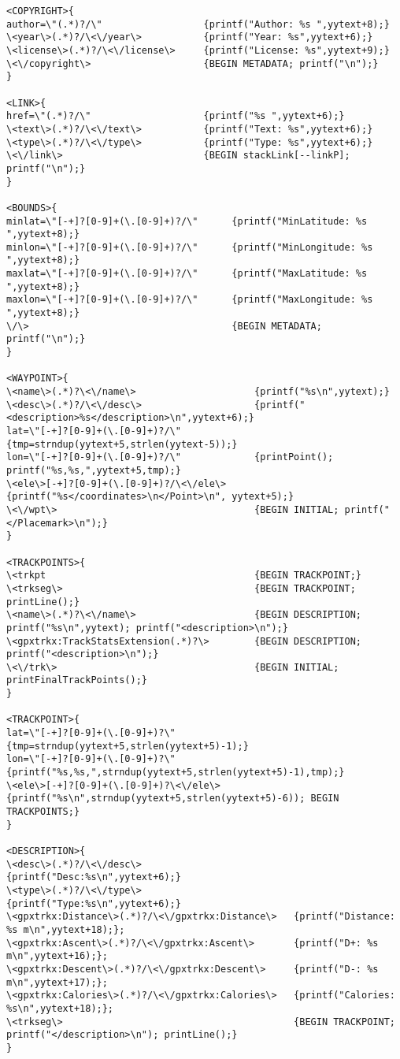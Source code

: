 \documentclass{llncs}
\begin{document}
\begin{changemargin}{-4cm}{0cm}
\begin{verbatim}
<COPYRIGHT>{
author=\"(.*)?/\"                  {printf("Author: %s ",yytext+8);}
\<year\>(.*)?/\<\/year\>           {printf("Year: %s",yytext+6);}
\<license\>(.*)?/\<\/license\>     {printf("License: %s",yytext+9);}
\<\/copyright\>                    {BEGIN METADATA; printf("\n");}
}

<LINK>{
href=\"(.*)?/\"                    {printf("%s ",yytext+6);}
\<text\>(.*)?/\<\/text\>           {printf("Text: %s",yytext+6);}
\<type\>(.*)?/\<\/type\>           {printf("Type: %s",yytext+6);}
\<\/link\>                         {BEGIN stackLink[--linkP]; printf("\n");}
}

<BOUNDS>{
minlat=\"[-+]?[0-9]+(\.[0-9]+)?/\"      {printf("MinLatitude: %s ",yytext+8);}
minlon=\"[-+]?[0-9]+(\.[0-9]+)?/\"      {printf("MinLongitude: %s ",yytext+8);}
maxlat=\"[-+]?[0-9]+(\.[0-9]+)?/\"      {printf("MaxLatitude: %s ",yytext+8);}
maxlon=\"[-+]?[0-9]+(\.[0-9]+)?/\"      {printf("MaxLongitude: %s ",yytext+8);}
\/\>                                    {BEGIN METADATA; printf("\n");}
}

<WAYPOINT>{
\<name\>(.*)?\<\/name\>                     {printf("%s\n",yytext);}
\<desc\>(.*)?/\<\/desc\>                    {printf("<description>%s</description>\n",yytext+6);}
lat=\"[-+]?[0-9]+(\.[0-9]+)?/\"             {tmp=strndup(yytext+5,strlen(yytext-5));}
lon=\"[-+]?[0-9]+(\.[0-9]+)?/\"             {printPoint(); printf("%s,%s,",yytext+5,tmp);}
\<ele\>[-+]?[0-9]+(\.[0-9]+)?/\<\/ele\>     {printf("%s</coordinates>\n</Point>\n", yytext+5);}
\<\/wpt\>                                   {BEGIN INITIAL; printf("</Placemark>\n");}
}

<TRACKPOINTS>{
\<trkpt                                     {BEGIN TRACKPOINT;}
\<trkseg\>                                  {BEGIN TRACKPOINT; printLine();}
\<name\>(.*)?\<\/name\>                     {BEGIN DESCRIPTION; printf("%s\n",yytext); printf("<description>\n");} 
\<gpxtrkx:TrackStatsExtension(.*)?\>        {BEGIN DESCRIPTION; printf("<description>\n");}
\<\/trk\>                                   {BEGIN INITIAL; printFinalTrackPoints();}
}

<TRACKPOINT>{
lat=\"[-+]?[0-9]+(\.[0-9]+)?\"              {tmp=strndup(yytext+5,strlen(yytext+5)-1);}
lon=\"[-+]?[0-9]+(\.[0-9]+)?\"              {printf("%s,%s,",strndup(yytext+5,strlen(yytext+5)-1),tmp);}
\<ele\>[-+]?[0-9]+(\.[0-9]+)?\<\/ele\>      {printf("%s\n",strndup(yytext+5,strlen(yytext+5)-6)); BEGIN TRACKPOINTS;}
}

<DESCRIPTION>{
\<desc\>(.*)?/\<\/desc\>                           {printf("Desc:%s\n",yytext+6);}
\<type\>(.*)?/\<\/type\>                           {printf("Type:%s\n",yytext+6);}
\<gpxtrkx:Distance\>(.*)?/\<\/gpxtrkx:Distance\>   {printf("Distance: %s m\n",yytext+18);};
\<gpxtrkx:Ascent\>(.*)?/\<\/gpxtrkx:Ascent\>       {printf("D+: %s m\n",yytext+16);};
\<gpxtrkx:Descent\>(.*)?/\<\/gpxtrkx:Descent\>     {printf("D-: %s m\n",yytext+17);};
\<gpxtrkx:Calories\>(.*)?/\<\/gpxtrkx:Calories\>   {printf("Calories: %s\n",yytext+18);};
\<trkseg\>                                         {BEGIN TRACKPOINT; printf("</description>\n"); printLine();}
}


\end{verbatim}
\end{changemargin}
\end{document}
